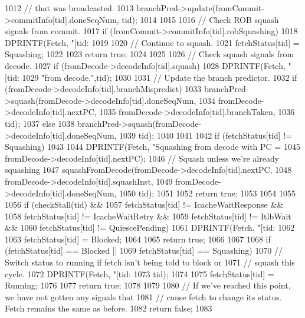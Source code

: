 \begin{DoxyCode}
{{1012         // that was broadcasted.
1013         branchPred->update(fromCommit->commitInfo[tid].doneSeqNum, tid);
1014     }
1015 
1016     // Check ROB squash signals from commit.
1017     if (fromCommit->commitInfo[tid].robSquashing) {
1018         DPRINTF(Fetch, "[tid:%
1019 
1020         // Continue to squash.
1021         fetchStatus[tid] = Squashing;
1022 
1023         return true;
1024     }
1025 
1026     // Check squash signals from decode.
1027     if (fromDecode->decodeInfo[tid].squash) {
1028         DPRINTF(Fetch, "[tid:%
1029                 "from decode.\n",tid);
1030 
1031         // Update the branch predictor.
1032         if (fromDecode->decodeInfo[tid].branchMispredict) {
1033             branchPred->squash(fromDecode->decodeInfo[tid].doneSeqNum,
1034                               fromDecode->decodeInfo[tid].nextPC,
1035                               fromDecode->decodeInfo[tid].branchTaken,
1036                               tid);
1037         } else {
1038             branchPred->squash(fromDecode->decodeInfo[tid].doneSeqNum,
1039                               tid);
1040         }
1041 
1042         if (fetchStatus[tid] != Squashing) {
1043 
1044             DPRINTF(Fetch, "Squashing from decode with PC = %
1045                 fromDecode->decodeInfo[tid].nextPC);
1046             // Squash unless we're already squashing
1047             squashFromDecode(fromDecode->decodeInfo[tid].nextPC,
1048                              fromDecode->decodeInfo[tid].squashInst,
1049                              fromDecode->decodeInfo[tid].doneSeqNum,
1050                              tid);
1051 
1052             return true;
1053         }
1054     }
1055 
1056     if (checkStall(tid) &&
1057         fetchStatus[tid] != IcacheWaitResponse &&
1058         fetchStatus[tid] != IcacheWaitRetry &&
1059         fetchStatus[tid] != ItlbWait &&
1060         fetchStatus[tid] != QuiescePending) {
1061         DPRINTF(Fetch, "[tid:%
1062 
1063         fetchStatus[tid] = Blocked;
1064 
1065         return true;
1066     }
1067 
1068     if (fetchStatus[tid] == Blocked ||
1069         fetchStatus[tid] == Squashing) {
1070         // Switch status to running if fetch isn't being told to block or
1071         // squash this cycle.
1072         DPRINTF(Fetch, "[tid:%
1073                 tid);
1074 
1075         fetchStatus[tid] = Running;
1076 
1077         return true;
1078     }
1079 
1080     // If we've reached this point, we have not gotten any signals that
1081     // cause fetch to change its status.  Fetch remains the same as before.
1082     return false;
1083 }
\end{DoxyCode}
